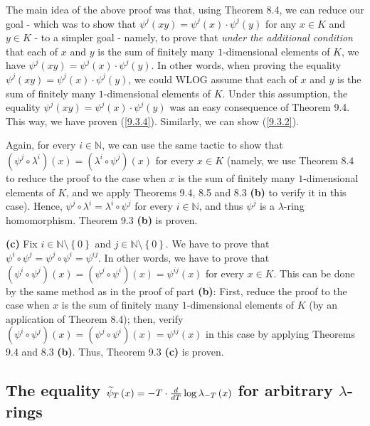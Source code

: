 \documentclass[numbers=enddot,12pt,final,onecolumn,notitlepage]{scrartcl}%
\begin{document}
The main idea of the above proof was that, using Theorem 8.4, we can reduce
our goal - which was to show that $\psi^{j}\left(  xy\right)  =\psi^{j}\left(
x\right)  \cdot\psi^{j}\left(  y\right)  $ for any $x\in K$ and $y\in K$ - to
a simpler goal - namely, to prove that \textit{under the additional condition}
that each of $x$ and $y$ is the sum of finitely many $1$-dimensional elements
of $K$, we have $\psi^{j}\left(  xy\right)  =\psi^{j}\left(  x\right)
\cdot\psi^{j}\left(  y\right)  $. In other words, when proving the equality
$\psi^{j}\left(  xy\right)  =\psi^{j}\left(  x\right)  \cdot\psi^{j}\left(
y\right)  $, we could WLOG assume that each of $x$ and $y$ is the sum of
finitely many $1$-dimensional elements of $K$. Under this assumption, the
equality $\psi^{j}\left(  xy\right)  =\psi^{j}\left(  x\right)  \cdot\psi
^{j}\left(  y\right)  $ was an easy consequence of Theorem 9.4. This way, we
have proven (\ref{9.3.4}). Similarly, we can show (\ref{9.3.2}).

Again, for every $i\in\mathbb{N}$, we can use the same tactic to show that
$\left(  \psi^{j}\circ\lambda^{i}\right)  \left(  x\right)  =\left(
\lambda^{i}\circ\psi^{j}\right)  \left(  x\right)  $ for every $x\in K$
(namely, we use Theorem 8.4 to reduce the proof to the case when $x$ is the
sum of finitely many $1$-dimensional elements of $K$, and we apply Theorems
9.4, 8.5 and 8.3 \textbf{(b)} to verify it in this case). Hence, $\psi
^{j}\circ\lambda^{i}=\lambda^{i}\circ\psi^{j}$ for every $i\in\mathbb{N}$, and
thus $\psi^{j}$ is a $\lambda$-ring homomorphism. Theorem 9.3 \textbf{(b)} is proven.

\textbf{(c)} Fix $i\in\mathbb{N}\setminus\left\{  0\right\}  $ and
$j\in\mathbb{N}\setminus\left\{  0\right\}  $. We have to prove that $\psi
^{i}\circ\psi^{j}=\psi^{j}\circ\psi^{i}=\psi^{ij}$. In other words, we have to
prove that $\left(  \psi^{i}\circ\psi^{j}\right)  \left(  x\right)  =\left(
\psi^{j}\circ\psi^{i}\right)  \left(  x\right)  =\psi^{ij}\left(  x\right)  $
for every $x\in K$. This can be done by the same method as in the proof of
part \textbf{(b)}: First, reduce the proof to the case when $x$ is the sum of
finitely many $1$-dimensional elements of $K$ (by an application of Theorem
8.4); then, verify $\left(  \psi^{i}\circ\psi^{j}\right)  \left(  x\right)
=\left(  \psi^{j}\circ\psi^{i}\right)  \left(  x\right)  =\psi^{ij}\left(
x\right)  $ in this case by applying Theorems 9.4 and 8.3 \textbf{(b)}. Thus,
Theorem 9.3 \textbf{(c)} is proven.

\subsection{The equality $\protect\widetilde{\psi}_{T}\left(  x\right)
=-T\cdot\frac{d}{dT}\log\lambda_{-T}\left(  x\right)  $ for arbitrary
$\lambda$-rings}
\end{document}
